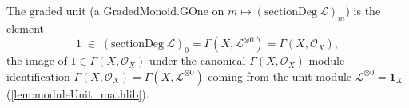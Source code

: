 \begin{definition}
  \label{def:sectionGradedGOne}
  The graded unit (a \(\mathrm{GradedMonoid.GOne}\) on
  \(m \mapsto (\mathrm{sectionDeg}\ \mathcal{L})_m\)) is the element
  \[
    1 \;\in\; (\mathrm{sectionDeg}\ \mathcal{L})_0
      = \Gamma(X, \mathcal{L}^{\otimes 0}) = \Gamma(X, \mathcal{O}_X),
  \]
  the image of \(1 \in \Gamma(X, \mathcal{O}_X)\) under the canonical
  \(\Gamma(X,\mathcal{O}_X)\)-module identification
  \(\Gamma(X, \mathcal{O}_X) = \Gamma(X, \mathcal{L}^{\otimes 0})\) coming from the
  unit module \(\mathcal{L}^{\otimes 0} = \mathbf{1}_X\)
  (\cref{lem:moduleUnit_mathlib}).
\end{definition}

